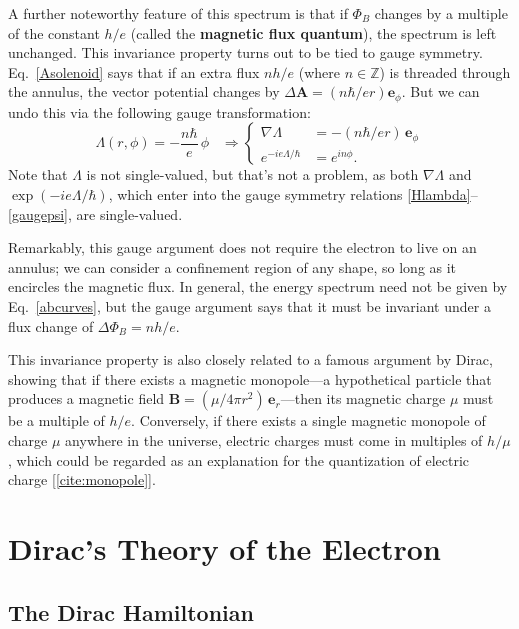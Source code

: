 \documentclass[prx,12pt]{revtex4-2}
\begin{document}
A further noteworthy feature of this spectrum is that if $\Phi_B$
changes by a multiple of the constant $h/e$ (called the
\textbf{magnetic flux quantum}), the spectrum is left unchanged.  This
invariance property turns out to be tied to gauge symmetry.
Eq.~\eqref{Asolenoid} says that if an extra flux $nh/e$ (where
$n\in\mathbb{Z}$) is threaded through the annulus, the vector
potential changes by $\Delta \mathbf{A} = (n\hbar/ e r)
\mathbf{e}_\phi$.  But we can undo this via the following gauge
transformation:
\begin{equation}
  \Lambda(r,\phi) = - \frac{n\hbar}{e} \, \phi \;\;\;\Rightarrow
  \begin{cases}\nabla \Lambda &= \displaystyle - (n\hbar/er) \, \mathbf{e}_\phi
    \\ \displaystyle e^{-ie\Lambda/\hbar} &= \displaystyle e^{in\phi}.
  \end{cases}
\end{equation}
Note that $\Lambda$ is not single-valued, but that's not a problem, as
both $\nabla\Lambda$ and $\exp(-ie\Lambda/\hbar)$, which enter into
the gauge symmetry relations \eqref{Hlambda}--\eqref{gaugepsi}, are
single-valued.

Remarkably, this gauge argument does not require the electron to live
on an annulus; we can consider a confinement region of any shape, so
long as it encircles the magnetic flux.  In general, the energy
spectrum need not be given by Eq.~\eqref{abcurves}, but the gauge
argument says that it must be invariant under a flux change of $\Delta
\Phi_B = n h/e$.

This invariance property is also closely related to a famous argument
by Dirac, showing that if there exists a magnetic monopole---a
hypothetical particle that produces a magnetic field $\mathbf{B} =
(\mu/4\pi r^2)\, \mathbf{e}_r$---then its magnetic charge $\mu$ must
be a multiple of $h/e$.  Conversely, if there exists a single magnetic
monopole of charge $\mu$ anywhere in the universe, electric charges
must come in multiples of $h/\mu$, which could be regarded as an
explanation for the quantization of electric charge
[\ref{cite:monopole}].

\section{Dirac's Theory of the Electron}

\subsection{The Dirac Hamiltonian}
\label{sec:DiracH}
\end{document}
